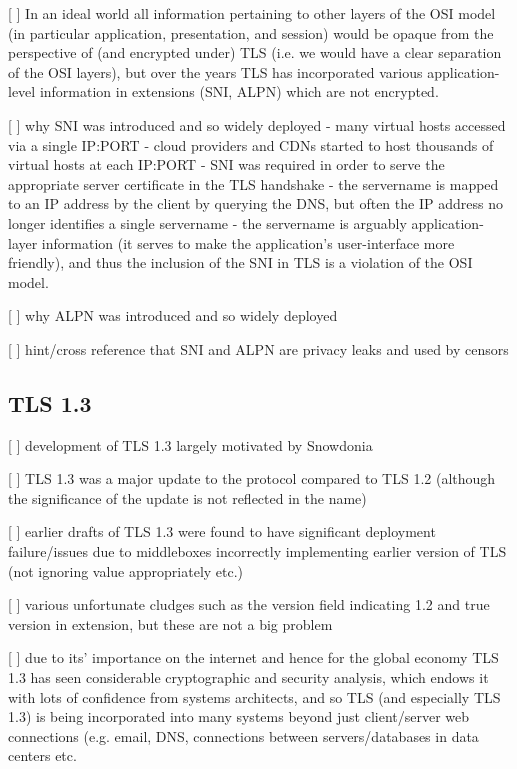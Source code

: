 [ ] In an ideal world all information pertaining to other layers of the OSI model (in particular application, presentation, and session) would be opaque from the perspective of (and encrypted under) TLS (i.e. we would have a clear separation of the OSI layers), but over the years TLS has incorporated various application-level information in extensions (SNI, ALPN) which are not encrypted.

[ ] why SNI was introduced and so widely deployed
          - many virtual hosts accessed via a single IP:PORT
          - cloud providers and CDNs started to host thousands of virtual hosts at each IP:PORT
          - SNI was required in order to serve the appropriate server certificate in the TLS handshake
          - the servername is mapped to an IP address by the client by querying the DNS, but often the IP address no longer identifies a single servername
          - the servername is arguably application-layer information (it serves to make the application's user-interface more friendly), and thus the inclusion of the SNI in TLS is a violation of the OSI model. 

[ ] why ALPN was introduced and so widely deployed

[ ] hint/cross reference that SNI and ALPN are privacy leaks and used by censors
\subsection{TLS 1.3}

[ ] development of TLS 1.3 largely motivated by Snowdonia

[ ] TLS 1.3 was a major update to the protocol compared to TLS 1.2 (although the significance of the update is not reflected in the name)

[ ] earlier drafts of TLS 1.3 were found to have significant deployment failure/issues due to middleboxes incorrectly implementing earlier version of TLS (not ignoring value appropriately etc.)

[ ] various unfortunate cludges such as the version field indicating 1.2 and true version in  extension, but these are not a big problem

[ ] due to its' importance on the internet and hence for the global economy TLS 1.3 has seen considerable cryptographic and security analysis, which endows it with lots of confidence from systems architects, and so TLS (and especially TLS 1.3) is being incorporated into many systems beyond just client/server web connections (e.g. email, DNS, connections between servers/databases in data centers etc.

